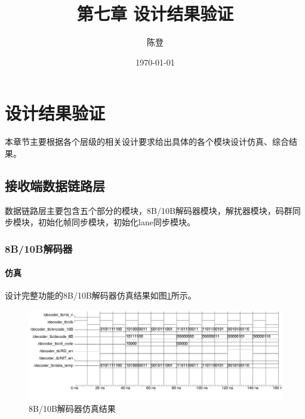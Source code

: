 \documentclass[UTF8]{ctexart}
\title{第七章 设计结果验证}
\author{陈登}
\date{\today}
\begin{document}
\section{设计结果验证}

本章节主要根据各个层级的相关设计要求给出具体的各个模块设计仿真、综合结果。

\subsection{接收端数据链路层}

数据链路层主要包含五个部分的模块，8B/10B解码器模块，解扰器模块，码群同步模块，初始化帧同步模块，初始化lane同步模块。

\subsubsection{8B/10B解码器}

\paragraph{仿真}

设计完整功能的8B/10B解码器仿真结果如图\ref{fig:8b_10b_decoder_wave}所示。

\begin{figure}[H]
	\centering
	\includegraphics[width=18cm]{./img/8b_10b_decoder_wave.pdf}
	\caption{8B/10B解码器仿真结果}
	\label{fig:8b_10b_decoder_wave}
\end{figure}
\end{document}
